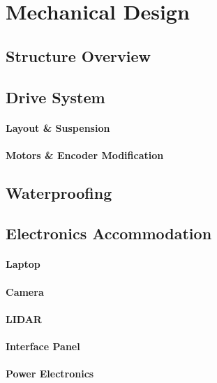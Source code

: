\section{Mechanical Design}

\subsection{Structure Overview}

\subsection{Drive System}
\paragraph{Layout \& Suspension}

\paragraph{Motors \& Encoder Modification}

\subsection{Waterproofing}

\subsection{Electronics Accommodation}
\paragraph{Laptop}

\paragraph{Camera}

\paragraph{LIDAR}

\paragraph{Interface Panel}

\paragraph{Power Electronics}
